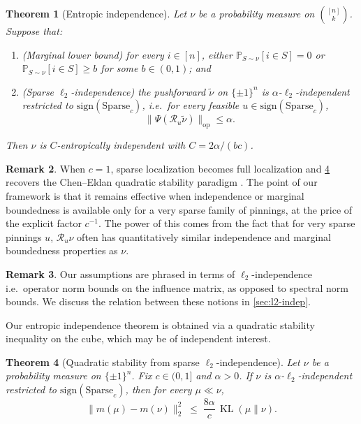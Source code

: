 \documentclass[11pt,reqno,letterpaper]{amsart}
\renewcommand{\P}{\mathbb{P}}
\numberwithin{equation}{section}
\newtheorem{theorem}{Theorem}[section]
\theoremstyle{definition}
\newtheorem{remark}[theorem]{Remark}
\newcommand{\wt}{\widetilde}
\newcommand{\KL}{\operatorname{KL}}
\begin{document}
\begin{theorem}[Entropic independence]
\label{thm:entropic-independence}
Let $\nu$ be a probability measure on $\binom{[n]}{k}$. Suppose that:
\begin{enumerate}[label=(\alph*),leftmargin=2.2em]
\item \emph{(Marginal lower bound)} for every $i\in[n]$, either $\P_{S\sim\nu}[i\in S]=0$ or
$\P_{S\sim\nu}[i\in S]\ge b$ for some $b\in(0,1)$; and
\item \emph{(Sparse $\ell_2$-independence)} the pushforward $\widetilde{\nu}$ on $\{\pm1\}^n$ is
$\alpha$-$\ell_2$-independent restricted to $\mathrm{sign}(\mathrm{Sparse}_c)$, i.e.~for every feasible $u \in \mathrm{sign}(\mathrm{Sparse}_c)$,
\[\|\Psi(\mathcal{R}_u \wt{\nu}) \|_{\mathrm{op}} \leq \alpha.\]
\end{enumerate}
Then $\nu$ is $C$-entropically independent with $C=2\alpha/(bc)$.
\end{theorem}

\begin{remark}
When $c=1$, sparse localization becomes full localization and \cref{thm:main-quadratic-stability} recovers the Chen--Eldan quadratic
stability paradigm \cite[Theorem~42]{chen2022localization}. The point of our framework is that it remains effective when
independence or marginal boundedness is available only for a very sparse family of pinnings, at the price of the explicit factor
$c^{-1}$. The power of this comes from the fact that for very sparse pinnings $u$, $\mathcal{R}_u \nu$ often has quantitatively similar independence and marginal boundedness properties as $\nu$. 
\end{remark}

\begin{remark}
    Our assumptions are phrased in terms of $\ell_2$-independence i.e.~operator norm bounds on the influence matrix, as opposed to spectral norm bounds. We discuss the relation between these notions in \cref{sec:l2-indep}. 
\end{remark}



Our entropic independence theorem is obtained via a quadratic stability inequality on the cube, which may be
of independent interest.

\begin{theorem}[Quadratic stability from sparse $\ell_2$-independence]
\label{thm:main-quadratic-stability}
Let $\nu$ be a probability measure on $\{\pm 1\}^n$. Fix $c\in(0,1]$ and $\alpha>0$.
If $\nu$ is $\alpha$-$\ell_2$-independent restricted to $\mathrm{sign}(\mathrm{Sparse}_c)$, then for every
$\mu\ll \nu$,
\[
\|m(\mu)-m(\nu)\|_2^2 \;\le\; \frac{8\alpha}{c}\,\KL(\mu\|\nu).
\]
\end{theorem}
\end{document}
